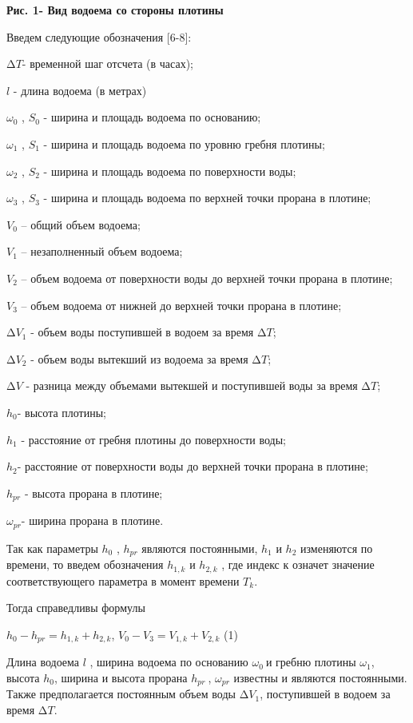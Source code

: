 {{\bfseries Рис. 1- Вид водоема со стороны плотины}

Введем следующие обозначения {[}6-8{]}:

\(\mathrm{\Delta}T\)- временной шаг отсчета (в часах);

\(l\) - длина водоема (в метрах)

\(\omega_{0}\) , \(S_{0}\) - ширина и площадь водоема по основанию;

\(\omega_{1}\) , \(S_{1}\) - ширина и площадь водоема по уровню гребня
плотины;

\(\omega_{2}\) , \(S_{2}\) - ширина и площадь водоема по поверхности
воды;

\(\omega_{3}\) , \(S_{3}\) - ширина и площадь водоема по верхней точки
прорана в плотине;

\(V_{0}\) -- общий объем водоема;

\(V_{1}\) -- незаполненный объем водоема;

\(V_{2}\) -- объем водоема от поверхности воды до верхней точки прорана
в плотине;

\(V_{3}\) -- объем водоема от нижней до верхней точки прорана в плотине;

\(\mathrm{\Delta}V_{1}\) - объем воды поступившей в водоем за время
\(\mathrm{\Delta}T\);

\(\mathrm{\Delta}V_{2}\) - объем воды вытекший из водоема за время
\(\mathrm{\Delta}T\);

\(\mathrm{\Delta}V\) - разница между объемами вытекшей и поступившей
воды за время \(\mathrm{\Delta}T\);

\(h_{0}\)- высота плотины;

\(h_{1}\) - расстояние от гребня плотины до поверхности воды;

\(h_{2}\)- расстояние от поверхности воды до верхней точки прорана в
плотине;

\(h_{pr}\) - высота прорана в плотине;

\(\omega_{pr}\)- ширина прорана в плотине.

Так как параметры \(h_{0}\) , \(h_{pr}\) являются постоянными, \(h_{1}\)
и \(h_{2}\) изменяются по времени, то введем обозначения \(h_{1,k}\) и
\(h_{2,k}\) , где индекс к означет значение соответствующего параметра в
момент времени \(T_{k}\).

Тогда справедливы формулы

\(h_{0} - h_{pr} = h_{1,k} + h_{2,k}\),
\(V_{0} - V_{3} = V_{1,k} + V_{2,k}\) (1)

Длина водоема \(l\) , ширина водоема по основанию \(\omega_{0}\ \)и
гребню плотины \(\omega_{1}\), высота \(h_{0}\), ширина и высота прорана
\(h_{pr}\ \), \(\omega_{pr}\) известны и являются постоянными. Также
предполагается постоянным объем воды \(\mathrm{\Delta}V_{1}\),
поступившей в водоем за время \(\mathrm{\Delta}T\).

}
